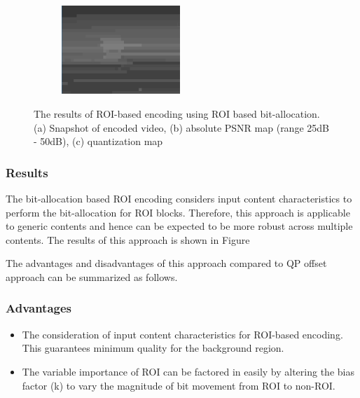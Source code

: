 \documentclass[11pt]{article} %
\begin{document}
\begin{figure}
\begin{subfigure}[t]{\textwidth}
		\centering
		\includegraphics[width=0.49\textwidth]{RC_bit_allocation/Paul250kbps_ROI_bit_alloc_quant.png}
		\caption{}
		\label{fig:ROI bit-allocation result quant}
	\end{subfigure}
	\caption{The results of ROI-based encoding using ROI based bit-allocation.(a) Snapshot of encoded video, (b) absolute PSNR map (range 25dB - 50dB), (c) quantization map}
	\label{fig:ROI bit-allocation result}
\end{figure}
\subsubsection{Results}
The bit-allocation based ROI encoding considers input content characteristics to perform the bit-allocation for ROI blocks. Therefore, this approach is applicable to generic contents and hence can be expected to be more robust across multiple contents. The results of this approach is shown in Figure 

The advantages and disadvantages of this approach compared to QP offset approach can be summarized as follows.
\subsubsection*{Advantages}
\begin{itemize}
\item The consideration of input content characteristics for ROI-based encoding. This guarantees minimum quality for the background region.
\item The variable importance of ROI can be factored in easily by altering the bias factor (k) to vary the magnitude of bit movement from ROI to non-ROI.
\end{itemize}
\end{document}
